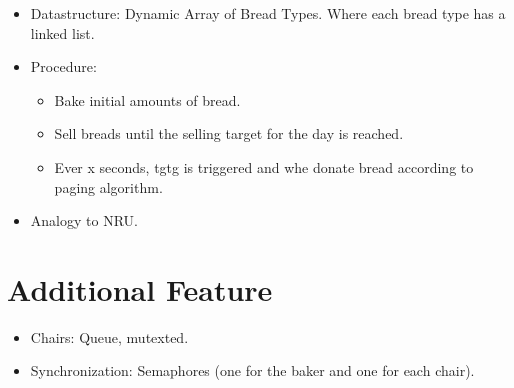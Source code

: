 \documentclass[11pt]{article}
\begin{document}
\begin{itemize}
\item Datastructure: Dynamic Array of Bread Types. Where each bread type has a linked list.\\
\item Procedure:\\
\begin{itemize}
\item Bake initial amounts of bread.\\
\item Sell breads until the selling target for the day is reached.\\
\item Ever x seconds, tgtg is triggered and whe donate bread according to paging algorithm.\\
\end{itemize}
\item Analogy to NRU.\\
\end{itemize}

\section{Additional Feature}
\label{sec:org57cd8b5}
\begin{itemize}
\item Chairs: Queue, mutexted.\\
\item Synchronization: Semaphores (one for the baker and one for each chair).\\
\end{itemize}
\end{document}
